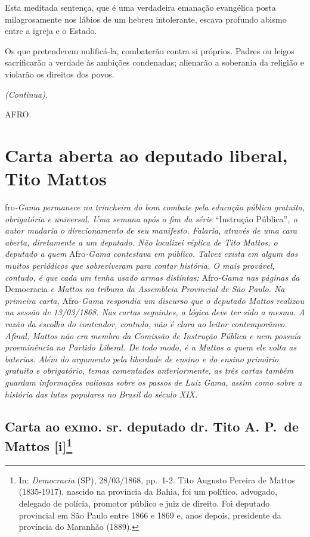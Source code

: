Esta meditada sentença, que é uma verdadeira emanação evangélica posta
milagrosamente nos lábios de um hebreu intolerante, escava profundo
abismo entre a igreja e o Estado.

Os que pretenderem nulificá-la, combaterão contra si próprios. Padres ou
leigos sacrificarão a verdade às ambições condenadas; alienarão a
soberania da religião e violarão os direitos dos povos.

\emph{(Continua).}

AFRO.

\part{Carta aberta ao deputado liberal, Tito Mattos}

\begin{didascalia}
fro\emph{-Gama permanece na trincheira do bom combate pela educação
pública gratuita, obrigatória e universal. Uma semana após o fim da
série} ``Instrução Pública''\emph{, o autor mudaria o direcionamento de
seu manifesto. Falaria, através de uma cara aberta, diretamente a um
deputado. Não localizei réplica de Tito Mattos, o deputado a quem}
Afro\emph{-Gama contestava em público. Talvez exista em algum dos muitos
periódicos que sobreviveram para contar história. O mais provável,
contudo, é que cada um tenha usado armas distintas:} Afro\emph{-Gama nas
páginas da} Democracia \emph{e Mattos na tribuna da Assembleia
Provincial de São Paulo. Na primeira carta,} Afro\emph{-Gama respondia
um discurso que o deputado Mattos realizou na sessão de 13/03/1868. Nas
cartas seguintes, a lógica deve ter sido a mesma. A razão da escolha do
contendor, contudo, não é clara ao leitor contemporâneo. Afinal, Mattos
não era membro da Comissão de Instrução Pública e nem possuía
proeminência no Partido Liberal. De todo modo, é a Mattos a quem ele
volta as baterias. Além do argumento pela liberdade de ensino e do
ensino primário gratuito e obrigatório, temas comentados anteriormente,
as três cartas também guardam informações valiosas sobre os passos de
Luiz Gama, assim como sobre a história das lutas populares no Brasil do
século XIX.}
\end{didascalia}

\chapter{Carta ao exmo. sr. deputado dr. Tito A. P.~de Mattos
{[}i{]}\footnote{In: \emph{Democracia} (SP), 28/03/1868, pp.~1-2. Tito
  Augusto Pereira de Mattos (1835-1917), nascido na província da Bahia,
  foi um político, advogado, delegado de polícia, promotor público e
  juiz de direito. Foi deputado provincial em São Paulo entre 1866 e
  1869 e, anos depois, presidente da província do Maranhão (1889).}}


